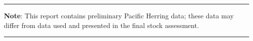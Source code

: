 \hrule
\textbf{Note}:
This report contains preliminary Pacific Herring data;
these data may differ from
data used and presented in the final stock assessment.
\vspace{1.5mm}
\hrule
